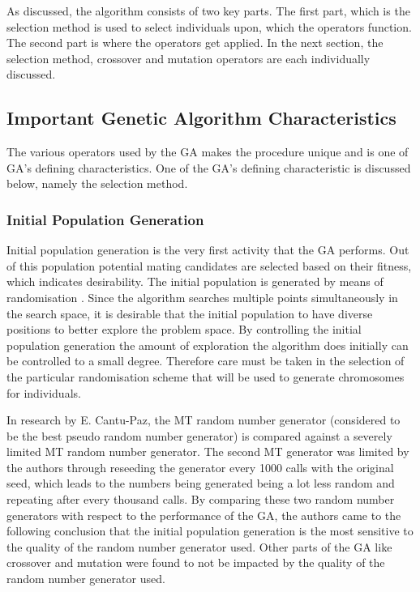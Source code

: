 As discussed, the algorithm consists of two key parts. The first part, which is the selection method is used to select individuals upon, which the operators function. The second part is where the operators get applied. In the next section, the selection method, crossover and mutation operators are each individually discussed.

\subsection{Important Genetic Algorithm Characteristics}
The various operators used by the \gls{GA} makes the procedure unique and is one of \gls{GA}'s defining characteristics. One of the \gls{GA}'s defining characteristic is discussed below, namely the selection method.

\subsubsection{Initial Population Generation}
Initial population generation is the very first activity that the \gls{GA} performs. Out of this population potential mating candidates are selected based on their fitness, which indicates desirability. The initial population is generated by means of randomisation \cite{SelfAdaptiveGA}. Since the algorithm searches multiple points simultaneously in the search space, it is desirable that the initial population to have diverse positions to better explore the problem space\cite{CombinedBranchBoundGA,DistributedHierarchicalGA}. By controlling the initial population generation the amount of exploration the algorithm does initially can be controlled to a small degree\cite{CombinedBranchBoundGA}. Therefore care must be taken in the selection of the particular randomisation scheme that will be used to generate chromosomes for individuals.

In research by E. Cantu-Paz, the \gls{MT} random number generator (considered to be the best pseudo random number generator) is compared against a severely limited \gls{MT} random number generator\cite{OnRandomGA}. The second \gls{MT} generator was limited by the authors through reseeding the generator every 1000 calls with the original seed, which leads to the numbers being generated being a lot less random and repeating after every thousand calls\cite{OnRandomGA, RLRandomGA}. By comparing these two random number generators with respect to the performance of the \gls{GA}, the authors came to the following conclusion that the initial population generation is the most sensitive to the quality of the random number generator used\cite{OnRandomGA}. Other parts of the \gls{GA} like crossover and mutation were found to not be impacted by the quality of the random number generator used\cite{OnRandomGA, RLRandomGA}.

